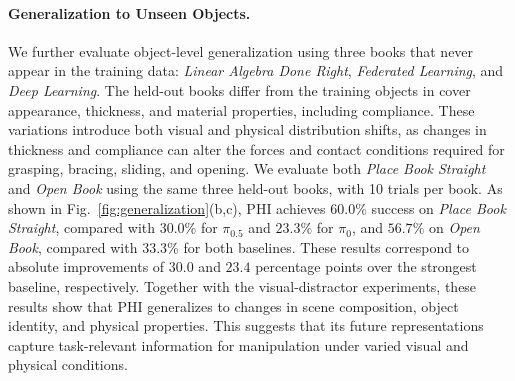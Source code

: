 \documentclass{article} %
\begin{document}

\paragraph{Generalization to Unseen Objects.}
We further evaluate object-level generalization using three books that never appear in the training data: \textit{Linear Algebra Done Right}, \textit{Federated Learning}, and \textit{Deep Learning}. The held-out books differ from the training objects in cover appearance, thickness, and material properties, including compliance. These variations introduce both visual and physical distribution shifts, as changes in thickness and compliance can alter the forces and contact conditions required for grasping, bracing, sliding, and opening. We evaluate both \textit{Place Book Straight} and \textit{Open Book} using the same three held-out books, with 10 trials per book. As shown in Fig.~\ref{fig:generalization}(b,c), PHI achieves $60.0\%$ success on \textit{Place Book Straight}, compared with $30.0\%$ for $\pi_{0.5}$ and $23.3\%$ for $\pi_0$, and $56.7\%$ on \textit{Open Book}, compared with $33.3\%$ for both baselines. These results correspond to absolute improvements of $30.0$ and $23.4$ percentage points over the strongest baseline, respectively. Together with the visual-distractor experiments, these results show that PHI generalizes to changes in scene composition, object identity, and physical properties. This suggests that its future representations capture task-relevant information for manipulation under varied visual and physical conditions.

\end{document}
